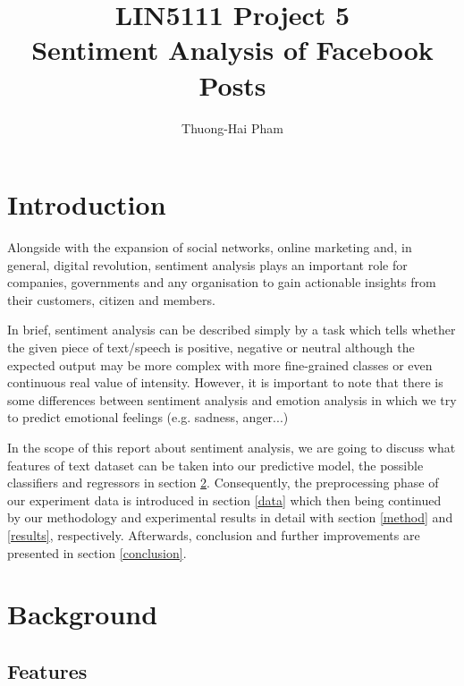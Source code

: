 \documentclass[12pt]{article}
\title{LIN5111 Project 5\\Sentiment Analysis of Facebook Posts}
\author{Thuong-Hai Pham}
\begin{document}
\maketitle

\section{Introduction}
Alongside with the expansion of social networks, online marketing and, in general, digital revolution, sentiment analysis plays an important role for companies, governments and any organisation to gain actionable insights from their customers, citizen and members.

In brief, sentiment analysis can be described simply by a task which tells whether the given piece of text/speech is positive, negative or neutral although the expected output may be more complex with more fine-grained classes or even continuous real value of intensity. However, it is important to note that there is some differences between sentiment analysis and emotion analysis in which we try to predict emotional feelings (e.g. sadness, anger...)

In the scope of this report about sentiment analysis, we are going to discuss what features of text dataset can be taken into our predictive model, the possible classifiers and regressors in section \ref{background}. Consequently, the preprocessing phase of our experiment data is introduced in section \ref{data} which then being continued by our methodology and experimental results in detail with section \ref{method} and \ref{results}, respectively. Afterwards, conclusion and further improvements are presented in section \ref{conclusion}.

\section{Background} \label{background}

\subsection{Features}
\end{document}
